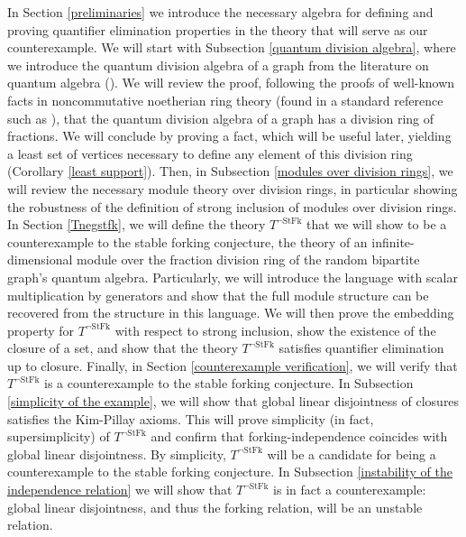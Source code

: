 \documentclass{amsart}
\theoremstyle{definition}
\theoremstyle{remark}
\numberwithin{equation}{section}
\begin{document}
In Section \ref{preliminaries} we introduce the necessary algebra for defining and proving quantifier elimination properties in the theory that will serve as our counterexample. We will start with Subsection \ref{quantum division algebra}, where we introduce the quantum division algebra of a graph from the literature on quantum algebra (\cite{Goodearl2024Binomial}). We will review the proof, following the proofs of well-known facts in noncommutative noetherian ring theory (found in a standard reference such as \cite{mcconnell1987noncommutative}), that the quantum division algebra of a graph has a division ring of fractions. We will conclude by proving a fact, which will be useful later, yielding a least set of vertices necessary to define any element of this division ring (Corollary \ref{least support}). Then, in Subsection \ref{modules over division rings}, we will review the necessary module theory over division rings, in particular showing the robustness of the definition of strong inclusion of modules over division rings. In Section \ref{Tnegstfk}, we will define the theory $T^{\neg \mathrm{StFk}}$ that we will show to be a counterexample to the stable forking conjecture, the theory of an infinite-dimensional module over the fraction division ring of the random bipartite graph's quantum algebra. Particularly, we will introduce the language with scalar multiplication by generators and show that the full module structure can be recovered from the structure in this language. We will then prove the embedding property for $T^{\neg \mathrm{StFk}}$ with respect to strong inclusion, show the existence of the closure of a set, and show that the theory $T^{\neg \mathrm{StFk}}$ satisfies quantifier elimination up to closure. Finally, in Section \ref{counterexample verification}, we will verify that $T^{\neg \mathrm{StFk}}$ is a counterexample to the stable forking conjecture. In Subsection \ref{simplicity of the example}, we will show that global linear disjointness of closures satisfies the Kim-Pillay axioms. This will prove simplicity (in fact, supersimplicity) of $T^{\neg \mathrm{StFk}}$ and confirm that forking-independence coincides with global linear disjointness. By simplicity, $T^{\neg \mathrm{StFk}}$ will be a candidate for being a counterexample to the stable forking conjecture. In Subsection \ref{instability of the independence relation} we will show that $T^{\neg \mathrm{StFk}}$ is in fact a counterexample: global linear disjointness, and thus the forking relation, will be an unstable relation.
\end{document}
